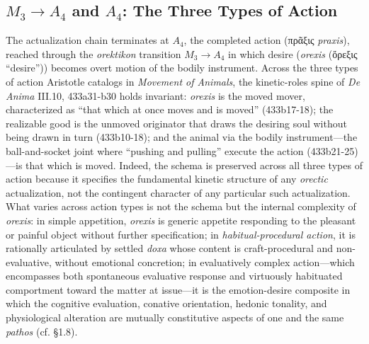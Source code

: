 \documentclass{article}
\newcommand{\gk}[1]{{\greekfont #1}}
\begin{document}
\subsection{$M_3 \rightarrow A_4$ and $A_4$: The Three Types of Action}

The actualization chain terminates at $A_4$, the completed action (\gk{πρᾶξις} \textit{praxis}), reached through the \textit{orektikon} transition $M_3 \rightarrow A_4$ in which desire (\textit{orexis} (\gk{ὄρεξις} ``desire'')) becomes overt motion of the bodily instrument. Across the three types of action Aristotle catalogs in \textit{Movement of Animals}, the kinetic-roles spine of \textit{De Anima} III.10, 433a31-b30 holds invariant: \textit{orexis} is the moved mover, characterized as ``that which at once moves and is moved'' (433b17-18); the realizable good is the unmoved originator that draws the desiring soul without being drawn in turn (433b10-18); and the animal via the bodily instrument---the ball-and-socket joint where ``pushing and pulling'' execute the action (433b21-25)---is that which is moved. Indeed, the schema is preserved across all three types of action because it specifies the fundamental kinetic structure of any \textit{orectic} actualization, not the contingent character of any particular such actualization. What varies across action types is not the schema but the internal complexity of \textit{orexis}: in simple appetition, \textit{orexis} is generic appetite responding to the pleasant or painful object without further specification; in \textit{habitual-procedural action}, it is rationally articulated by settled \textit{doxa} whose content is craft-procedural and non-evaluative, without emotional concretion; in evaluatively complex action---which encompasses both spontaneous evaluative response and virtuously habituated comportment toward the matter at issue---it is the emotion-desire composite in which the cognitive evaluation, conative orientation, hedonic tonality, and physiological alteration are mutually constitutive aspects of one and the same \textit{pathos} (cf. \S 1.8).
\end{document}
